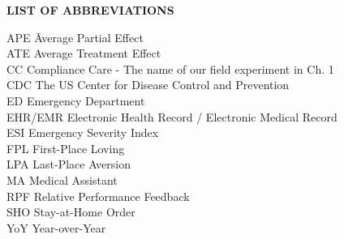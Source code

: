 {}

\begin{center}
{\normalfont \textbf{LIST OF ABBREVIATIONS}}
\end{center}

\newcommand{\Ab}[2]{\noindent  #1 \> #2 \\}
\newcommand{\Abi}[2]{\noindent #1 \hspace{1.5cm} \= #2 \\}

\begin{tabbing}
\Abi{APE}{Average Partial Effect} 
\Ab{ATE}{Average Treatment Effect}
\Ab{CC}{Compliance Care - The name of our field experiment in Ch. 1}
\Ab{CDC}{The US Center for Disease Control and Prevention}
\Ab{ED}{Emergency Department}
\Ab{EHR/EMR}{Electronic Health Record / Electronic Medical Record}
\Ab{ESI}{Emergency Severity Index}
\Ab{FPL}{First-Place Loving}
\Ab{LPA}{Last-Place Aversion}
\Ab{MA}{Medical Assistant}
\Ab{RPF}{Relative Performance Feedback}
\Ab{SHO}{Stay-at-Home Order}
\Ab{YoY}{Year-over-Year}
\end{tabbing}

\clearpage
